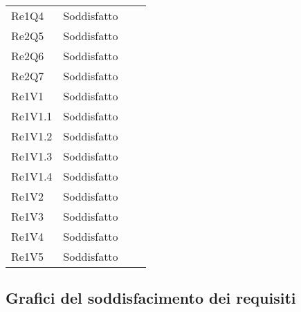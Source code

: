 \begin{longtable}{C{3cm} C{3cm} L{5.5cm} C{3cm}}
Re1Q4 & Soddisfatto\\
Re2Q5 & Soddisfatto\\
Re2Q6 & Soddisfatto\\
Re2Q7 & Soddisfatto\\
Re1V1 & Soddisfatto\\
Re1V1.1 & Soddisfatto\\
Re1V1.2 & Soddisfatto\\
Re1V1.3 & Soddisfatto\\
Re1V1.4 & Soddisfatto\\
Re1V2 & Soddisfatto\\
Re1V3 & Soddisfatto\\
Re1V4 & Soddisfatto\\
Re1V5 & Soddisfatto\\
\end{longtable}

\subsection{Grafici del soddisfacimento dei requisiti}